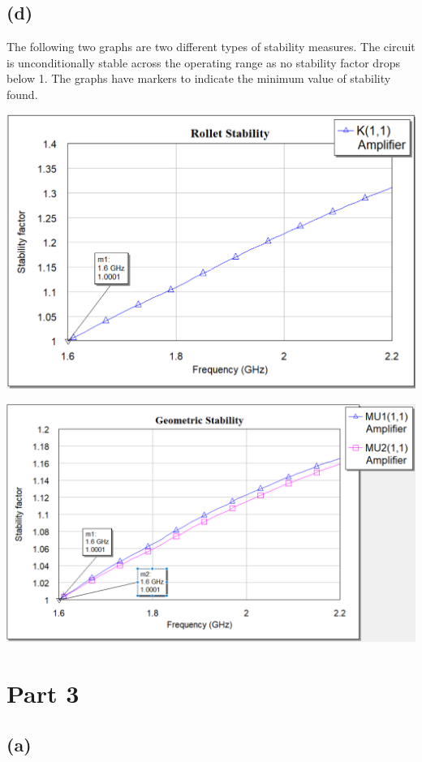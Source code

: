 \documentclass[12pt]{article}
\begin{document}
\subsection*{(d)}
The following two graphs are two different types of stability measures. The circuit is unconditionally stable across the operating range
as no stability factor drops below 1. The graphs have markers to indicate the minimum value of stability found.

\includegraphics[width=\textwidth]{2 rollet stability.png}

\includegraphics[width=\textwidth]{2 geometric stability.png}

\section*{Part 3}
\subsection*{(a)}
\end{document}
